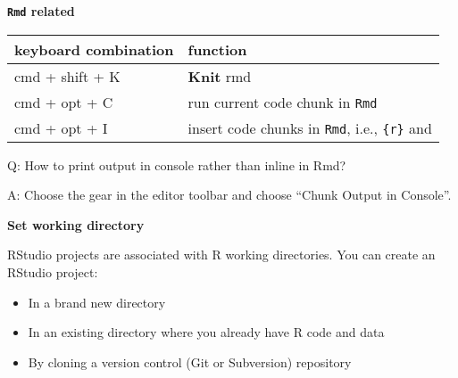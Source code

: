 \documentclass[
]{book}
\newenvironment{Shaded}{\begin{snugshade}}{\end{snugshade}}
\newcommand{\CommentTok}[1]{\textcolor[rgb]{0.56,0.35,0.01}{\textit{#1}}}
\newcommand{\FunctionTok}[1]{\textcolor[rgb]{0.13,0.29,0.53}{\textbf{#1}}}
\newcommand{\NormalTok}[1]{#1}
\newcommand{\OtherTok}[1]{\textcolor[rgb]{0.56,0.35,0.01}{#1}}
\newcommand{\SpecialCharTok}[1]{\textcolor[rgb]{0.81,0.36,0.00}{\textbf{#1}}}
\providecommand{\tightlist}{%
  \setlength{\itemsep}{0pt}\setlength{\parskip}{0pt}}
\begin{document}
{\textbf{\texttt{Rmd} related}}

\begin{longtable}[]{@{}
  >{\raggedright\arraybackslash}p{}
  >{\raggedright\arraybackslash}p{}@{}}
\toprule\noalign{}
\begin{minipage}[b]{\linewidth}\raggedright
keyboard combination
\end{minipage} & \begin{minipage}[b]{\linewidth}\raggedright
function
\end{minipage} \\
\midrule\noalign{}
\endhead
\bottomrule\noalign{}
\endlastfoot
cmd + shift + K & \textbf{Knit} rmd \\
cmd + opt + C & run current code chunk in \texttt{Rmd} \\
cmd + opt + I & insert code chunks in \texttt{Rmd}, i.e., \texttt{\textasciigrave{}\textasciigrave{}\textasciigrave{}\{r\}} and \texttt{\textasciigrave{}\textasciigrave{}\textasciigrave{}} \\
\end{longtable}

Q: How to print output in console rather than inline in Rmd?

A: Choose the gear in the editor toolbar and choose ``Chunk Output in Console''.

{\textbf{Set working directory}}

\begin{Shaded}
\end{Shaded}

RStudio projects are associated with R working directories. You can create an RStudio project:

\begin{itemize}
\tightlist
\item
  In a brand new directory
\item
  In an existing directory where you already have R code and data
\item
  By cloning a version control (Git or Subversion) repository
\end{itemize}
\end{document}
